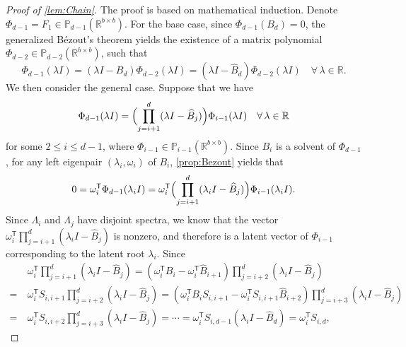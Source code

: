 \documentclass{article}
\newcommand{\Ttran}{\mathsf{T}}
\newcommand{\poly}{\mathbb{P}}
\newcommand{\fp}{F}
\newcommand{\R}{\mathbb{R}}
\begin{document}
\begin{proof}[Proof of \cref{lem:Chain}]
    The proof is based on mathematical induction. Denote $\Phi_{d-1}=\fp_{1}\in\poly_{d-1}(\R^{b\times b})$.
    For the base case, since $\Phi_{d-1}(B_{d})=0$, the generalized B\'ezout's theorem yields the existence of a matrix polynomial $\Phi_{d-2}\in\poly_{d-2}(\R^{b\times b})$, such that  
    \begin{equation*}
        \Phi_{d-1}(\lambda I) = (\lambda I-B_{d})\Phi_{d-2}(\lambda I) = (\lambda I-\widehat{B}_{d})\Phi_{d-2}(\lambda I) \quad \forall\,\lambda\in\R.
    \end{equation*}
    We then consider the general case.
    Suppose that we have 
    \begin{equation}
        \label{eq:indasp}
        \Phi_{d-1}(\lambda I) = \Bigl(\prod_{j=i+1}^{d}(\lambda I-\widehat{B}_{j})\Bigr)\Phi_{i-1}(\lambda I) \quad \forall\,\lambda\in\R
    \end{equation}
    for some $2\leq i\leq d-1$, where $\Phi_{i-1}\in\poly_{i-1}(\R^{b\times b})$.
    Since $B_{i}$ is a solvent of $\Phi_{d-1}$, for any left eigenpair $(\lambda_{i},\omega_{i})$ of $B_{i}$, \cref{prop:Bezout} yields that 
    \begin{equation}
        \label{eq:lemLamMat1}
        0 = \omega_{i}^{\Ttran}\Phi_{d-1}(\lambda_{i} I) = \omega_{i}^{\Ttran}\Bigl(\prod_{j=i+1}^{d}(\lambda_{i} I-\widehat{B}_{j})\Bigr)\Phi_{i-1}(\lambda_{i} I).
    \end{equation}
    Since $\Lambda_{i}$ and $\Lambda_{j}$ have disjoint spectra, we know that the vector  $\omega_{i}^{\Ttran}\prod_{j=i+1}^{d}(\lambda_{i} I-\widehat{B}_{j})$ is nonzero, and therefore is a latent vector of $\Phi_{i-1}$ corresponding to the latent root $\lambda_{i}$.
    Since
    \begin{equation}
        \label{eq:solventS}
        \begin{aligned}
            &\omega_{i}^{\Ttran}\prod_{j=i+1}^{d}(\lambda_{i} I-\widehat{B}_{j}) = (\omega_{i}^{\Ttran}B_{i}-\omega_{i}^{\Ttran}\widehat{B}_{i+1})\prod_{j=i+2}^{d}(\lambda_{i} I-\widehat{B}_{j})\\ 
            =\ &\omega_{i}^{\Ttran}S_{i,i+1}\prod_{j=i+2}^{d}(\lambda_{i} I-\widehat{B}_{j}) = (\omega_{i}^{\Ttran}B_{i}S_{i,i+1}-\omega_{i}^{\Ttran}S_{i,i+1}\widehat{B}_{i+2})\prod_{j=i+3}^{d}(\lambda_{i} I-\widehat{B}_{j})\\ 
            =\ &\omega_{i}^{\Ttran}S_{i,i+2}\prod_{j=i+3}^{d}(\lambda_{i} I-\widehat{B}_{j})= \dotsb = \omega_{i}^{\Ttran}S_{i,d-1}(\lambda_{i} I-\widehat{B}_{d}) = \omega_{i}^{\Ttran}S_{i,d},

\end{aligned}
\end{equation}
\end{proof}
\end{document}
